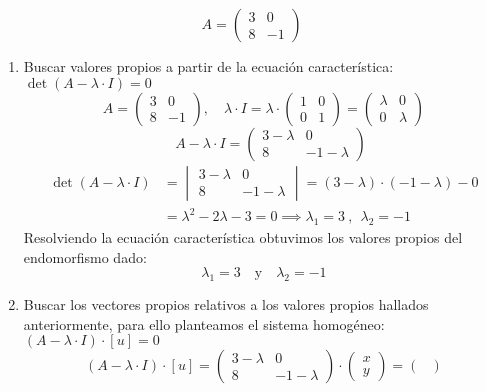 \[
  A = \begin{pmatrix}
    3 & 0 \\
    8 & -1
  \end{pmatrix}
\]
\begin{enumerate}
  \item Buscar valores propios a partir de la ecuación característica: \(\det(A-\lambda \cdot I) = 0\)
  \[
    A = \begin{pmatrix}
      3 & 0 \\ 8 & -1
    \end{pmatrix}, \quad \lambda \cdot I = \lambda \cdot \begin{pmatrix}
      1 & 0 \\ 0 & 1
    \end{pmatrix} = \begin{pmatrix}
      \lambda & 0 \\
      0 & \lambda
    \end{pmatrix}
  \]
  \[ 
    \quad A - \lambda \cdot I = \begin{pmatrix}
      3 - \lambda & 0 \\ 8 & -1-\lambda
    \end{pmatrix}
  \]
  \begin{align*}
    \det(A-\lambda \cdot I) &= \begin{vmatrix}
      3-\lambda & 0 \\ 8 & -1-\lambda
    \end{vmatrix} = (3-\lambda) \cdot (-1-\lambda) - 0 \\
    &= \lambda ^2 -2 \lambda  - 3 = 0 \implies \lambda_1 = 3 ~,~~ \lambda_2 = -1
  \end{align*}
  Resolviendo la ecuación característica obtuvimos los valores propios del endomorfismo dado:
  \[
    \lambda_1 = 3 \quad \text{y} \quad \lambda_2 = -1
  \]
  \item Buscar los vectores propios relativos a los valores propios hallados anteriormente, para ello planteamos el sistema homogéneo: \((A-\lambda \cdot I)\cdot [u] = 0\)
  \[
    (A-\lambda \cdot I)\cdot [u] = \begin{pmatrix}
      3-\lambda & 0 \\ 8 & -1-\lambda
    \end{pmatrix} \cdot \begin{pmatrix}
      x \\ y
    \end{pmatrix} = \begin{pmatrix}

\end{pmatrix}\]
\end{enumerate}
